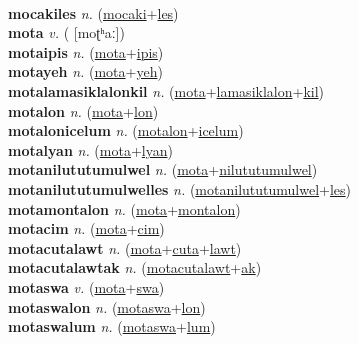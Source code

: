  \label{mocaki} \\
\textbf{mocakiles} \textit{n.} (\hyperref[mocaki]{mocaki}+\hyperref[les]{les})
 \label{mocakiles} \\
\textbf{mota} \textit{v.} ( [moʈʰaː])
 \label{mota} \\
\textbf{motaipis} \textit{n.} (\hyperref[mota]{mota}+\hyperref[ipis]{ipis})
 \label{motaipis} \\
\textbf{motayeh} \textit{n.} (\hyperref[mota]{mota}+\hyperref[yeh]{yeh})
 \label{motayeh} \\
\textbf{motalamasiklalonkil} \textit{n.} (\hyperref[mota]{mota}+\hyperref[lamasiklalon]{lamasiklalon}+\hyperref[kil]{kil})
 \label{motalamasiklalonkil} \\
\textbf{motalon} \textit{n.} (\hyperref[mota]{mota}+\hyperref[lon]{lon})
 \label{motalon} \\
\textbf{motalonicelum} \textit{n.} (\hyperref[motalon]{motalon}+\hyperref[icelum]{icelum})
 \label{motalonicelum} \\
\textbf{motalyan} \textit{n.} (\hyperref[mota]{mota}+\hyperref[lyan]{lyan})
 \label{motalyan} \\
\textbf{motanilututumulwel} \textit{n.} (\hyperref[mota]{mota}+\hyperref[nilututumulwel]{nilututumulwel})
 \label{motanilututumulwel} \\
\textbf{motanilututumulwelles} \textit{n.} (\hyperref[motanilututumulwel]{motanilututumulwel}+\hyperref[les]{les})
 \label{motanilututumulwelles} \\
\textbf{motamontalon} \textit{n.} (\hyperref[mota]{mota}+\hyperref[montalon]{montalon})
 \label{motamontalon} \\
\textbf{motacim} \textit{n.} (\hyperref[mota]{mota}+\hyperref[cim]{cim})
 \label{motacim} \\
\textbf{motacutalawt} \textit{n.} (\hyperref[mota]{mota}+\hyperref[cuta]{cuta}+\hyperref[lawt]{lawt})
 \label{motacutalawt} \\
\textbf{motacutalawtak} \textit{n.} (\hyperref[motacutalawt]{motacutalawt}+\hyperref[ak]{ak})
 \label{motacutalawtak} \\
\textbf{motaswa} \textit{v.} (\hyperref[mota]{mota}+\hyperref[swa]{swa})
 \label{motaswa} \\
\textbf{motaswalon} \textit{n.} (\hyperref[motaswa]{motaswa}+\hyperref[lon]{lon})
 \label{motaswalon} \\
\textbf{motaswalum} \textit{n.} (\hyperref[motaswa]{motaswa}+\hyperref[lum]{lum})
 \label{motaswalum} \\
